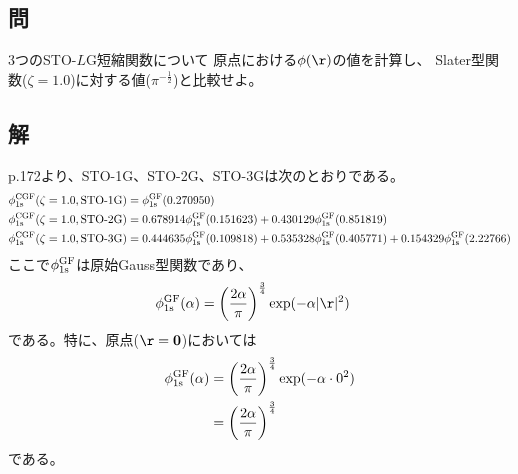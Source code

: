 \subsection{問}
3つのSTO-$L$G短縮関数について
原点における$\phi(\r)$の値を計算し、
Slater型関数($\zeta=1.0$)に対する値($\pi^{-\frac{1}{2}}$)と比較せよ。


\subsection{解}
p.172より、STO-1G、STO-2G、STO-3Gは次のとおりである。
\begin{align}
	\phi^{\rm CGF}_{\rm 1s}(\zeta=1.0,\text{STO-1G})
&=
	\phi^{\rm GF}_{\rm 1s}(0.270950) \\
%
%
	\phi^{\rm CGF}_{\rm 1s}(\zeta=1.0,\text{STO-2G})
&=
	0.678914
	\phi^{\rm GF}_{\rm 1s}(0.151623)
	+
	0.430129
	\phi^{\rm GF}_{\rm 1s}(0.851819) \\
%
%
	\phi^{\rm CGF}_{\rm 1s}(\zeta=1.0,\text{STO-3G})
&=
	0.444635
	\phi^{\rm GF}_{\rm 1s}(0.109818)
	+
	0.535328
	\phi^{\rm GF}_{\rm 1s}(0.405771)
	+
	0.154329
	\phi^{\rm GF}_{\rm 1s}(2.22766)
\end{align}
ここで$\phi^{\rm GF}_{\rm 1s}$は原始Gauss型関数であり、
\begin{align}
	\phi^{\rm GF}_{\rm 1s}(\alpha)
&=
	\left(
		\frac{2\alpha}{\pi}
	\right)^{\frac{3}{4}}
	\exp(-\alpha|\r|^2)
\end{align}
である。特に、原点($\r=\bm{0}$)においては
\begin{align}
	\phi^{\rm GF}_{\rm 1s}(\alpha)
&=
	\left(
		\frac{2\alpha}{\pi}
	\right)^{\frac{3}{4}}
	\exp(-\alpha\cdot 0^2) \\
%
%
&=
	\left(
		\frac{2\alpha}{\pi}
	\right)^{\frac{3}{4}}
\end{align}
である。

